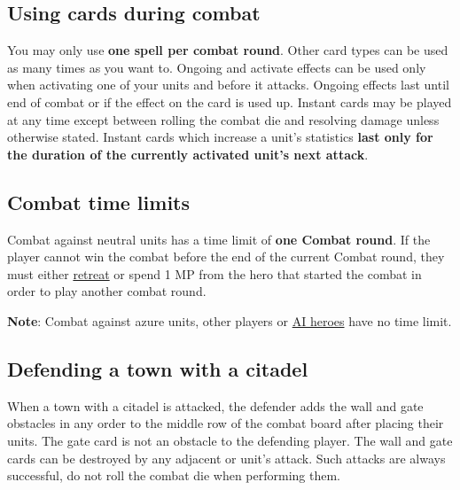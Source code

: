 \subsection*{\hypertarget{CombatCards}{Using cards during combat}}
You may only use \textbf{one spell per combat round}.
Other card types can be used as many times as you want to.
Ongoing  and  activate effects can be used only when activating one of your units and before it attacks.
Ongoing effects last until end of combat or if the effect on the card is used up.
Instant  cards may be played at any time except between rolling the combat die and resolving damage unless otherwise stated.
Instant cards which increase a unit's statistics \textbf{last only for the duration of the currently activated unit's next attack}.
\subsection*{\hypertarget{Timelimit}{Combat time limits}}
Combat against neutral units has a time limit of \textbf{one Combat round}.
If the player cannot win the combat before the end of the current Combat round, they must either \hyperlink{Endcombat}{retreat} or spend 1 MP from the hero that started the combat in order to play another combat round.\par
\textbf{Note}: Combat against azure  units, other players or \hyperlink{AIrules}{AI heroes} have no time limit.
\clearpage
\subsection*{\hypertarget{Walls}{Defending a town with a citadel}}

When a town with a citadel is attacked, the defender adds the wall and gate obstacles in any order to the middle row of the combat board after placing their units.
The gate card is not an obstacle to the defending player.
The wall and gate cards can be destroyed by any adjacent  or  unit's attack.
Such attacks are always successful, do not roll the combat die when performing them.\par

